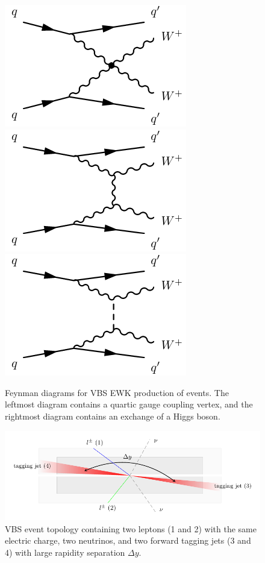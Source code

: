 \begin{figure}[htbp]
  \centering
  \includegraphics[width=.32\textwidth]{figs/ssww_13tev/diagrams/vbs1}
  \includegraphics[width=.32\textwidth]{figs/ssww_13tev/diagrams/vbs2}
  \includegraphics[width=.32\textwidth]{figs/ssww_13tev/diagrams/vbs3}
  \caption{Feynman diagrams for VBS EWK production of \ssww events. The leftmost diagram contains a quartic gauge coupling vertex, and the rightmost diagram contains an exchange of a Higgs boson.}
  \label{fig:ssww13tev_diagrams_vbs_ssww}
\end{figure}

\begin{figure}[htbp]
  \centering
  \includegraphics[width=.95\textwidth]{figs/ssww_13tev/introduction/vbs_event_topology}
  \caption{\ssww VBS event topology containing two leptons (1 and 2) with the same electric charge, two neutrinos, and two forward tagging jets (3 and 4) with large rapidity separation $\Delta y$.}
  \label{fig:ssww13tev_event_topology}
\end{figure}

